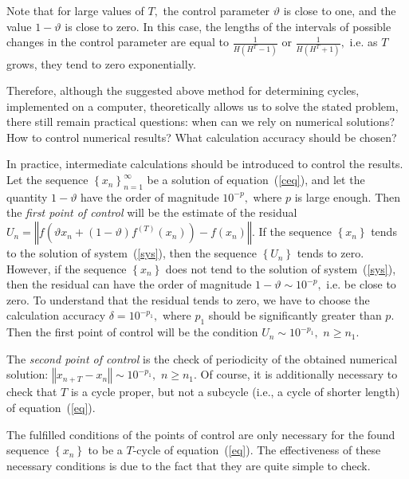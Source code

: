 \documentclass[12pt,a4paper]{amsart}
\begin{document}
Note that for large values of $T,$ the control parameter $\vartheta$ is close to one, and the value $1-\vartheta$ is close to zero. 
In this case, the lengths of the intervals of possible changes in the control parameter are equal to $\frac{1}{H(H^T-1)}$ or
$\frac{1}{H(H^T+1)},$ i.e. as $T$ grows, they tend to zero exponentially. 

Therefore, although the suggested above method for determining cycles, implemented on a computer, theoretically allows us to solve 
the stated problem, there still remain practical questions: when can we rely on numerical solutions? How to control numerical results? 
What calculation accuracy should be chosen?

In practice, intermediate calculations should be introduced to control the results. Let the sequence $\left\{x_n\right\}_{n=1}^{\infty}$ 
be a solution of equation~(\ref{ceq}), and let the quantity $1-\vartheta$ have the order of magnitude $10^{-p},$ where 
$p$ is large enough. Then the \textit{first point of control} will be the estimate of the residual 
$U_n = \left\Vert f\left( \vartheta x_n + (1 - \vartheta) f^{(T)}(x_n)\right) - f(x_n)\right\Vert.$ If the sequence $\left\{x_n\right\}$ 
tends to the solution of system~(\ref{sys}), then the sequence $\left\{U_n\right\}$ tends to zero. However, if the sequence 
$\left\{x_n\right\}$ does not tend to the solution of system~(\ref{sys}), then the residual can have the order of magnitude 
${1 - \vartheta}\sim 10^{-p},$ i.e. be close to zero. To understand that the residual tends to zero, we have to choose the calculation 
accuracy $\delta=10^{-p_1},$ where $p_1$ should be significantly greater than $p.$ Then the first point of control will be the condition
${U_n}\sim 10^{-p_1},$ $n\geq n_1.$

The \textit{second point of control} is the check of periodicity of the obtained numerical solution: 
$\left\Vert x_{n+T} - x_n\right\Vert \sim 10^{-p_1},$ $n\geq n_1.$ Of course, it is additionally necessary to check that $T$ is a cycle proper, 
but not a subcycle (i.e., a cycle of shorter length) of equation~(\ref{eq}).

The fulfilled conditions of the points of control are only necessary for the found sequence $\left\{x_n\right\}$ to be a $T$-cycle 
of equation~(\ref{eq}). The effectiveness of these necessary conditions is due to the fact that they are quite simple to check.
\end{document}
